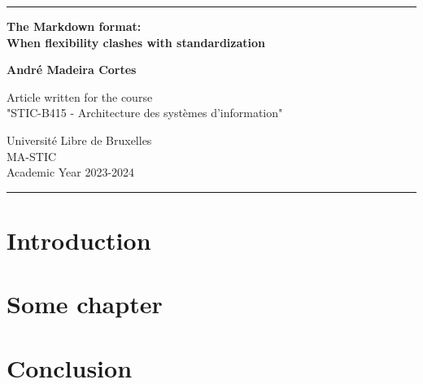 \documentclass[a4paper,12pt]{report}
\begin{document}
\begin{titlepage}
	\center

	\rule{\linewidth}{1pt} %

	\vspace{2cm}

	\Large \textbf{
		The Markdown format: \\ \vspace{0.2cm} When flexibility clashes with standardization
	}

	\vspace{2cm}

	\large \textbf{ André Madeira Cortes }

	\vspace{12cm}

	Article written for the course \\ "STIC-B415 - Architecture des systèmes d'information" \\

	\vspace{0.8cm}

	Université Libre de Bruxelles\\
	MA-STIC \\
	Academic Year 2023-2024

	\rule{\linewidth}{1pt} %
\end{titlepage}

\newpage
\tableofcontents
\newpage
\listoffigures
\newpage


\chapter*{Introduction}

\chapter*{Some chapter}

\chapter*{Conclusion}

\printbibliography
\end{document}
